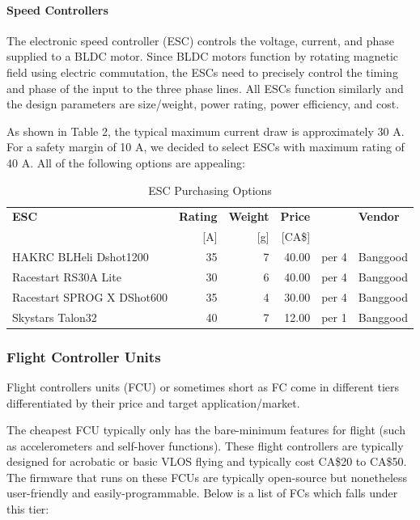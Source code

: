 \paragraph{Speed Controllers}

The electronic speed controller (ESC) controls the voltage, current, and phase supplied to a BLDC motor. Since BLDC motors function by rotating magnetic field using electric commutation, the ESCs need to precisely control the timing and phase of the input to the three phase lines. All ESCs function similarly and the design parameters are size/weight, power rating, power efficiency, and cost.

As shown in Table 2, the typical maximum current draw is approximately 30 A. For a 
safety margin of 10 A, we decided to select ESCs with maximum rating of 40 A. All of the following options are appealing:

\begin{table}[H]
    \centering
    \caption{ESC Purchasing Options}
    \label{table:esc-table}

    \begin{tabular}{lrrrll}

    \hline
    \textbf{ESC} & \textbf{Rating} & \textbf{Weight} & \textbf{Price}  & & \textbf{Vendor}\\
    & [A] & [g] & [CA\$] & & \\
    \hline
    HAKRC BLHeli Dshot1200 & 35 & 7  & 40.00 & per 4 & Banggood\\
    Racestart RS30A Lite & 30 & 6  & 40.00 & per 4 & Banggood\\
    Racestart SPROG X DShot600 & 35 & 4  & 30.00 & per 4 & Banggood\\
    Skystars Talon32 & 40 & 7  & 12.00 & per 1 & Banggood\\
    \hline

    \end{tabular} 
\end{table}

\subsubsection{Flight Controller Units}

Flight controllers units (FCU) or sometimes short as FC come in different tiers differentiated by their price and target application/market. 

The cheapest FCU typically only has the bare-minimum features for flight (such as accelerometers and self-hover functions). These flight controllers are typically designed for acrobatic or basic VLOS flying and typically cost CA\$20 to CA\$50. The firmware that runs on these FCUs are typically open-source but nonetheless user-friendly and easily-programmable. Below is a list of FCs which falls under this tier:

